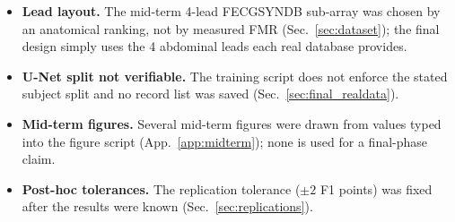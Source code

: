 \begin{finalpart}
\begin{itemize}
    \item \textbf{Lead layout.} The mid-term 4-lead FECGSYNDB sub-array was chosen by an anatomical ranking, not by measured FMR (Sec.~\ref{sec:dataset}); the final design simply uses the 4 abdominal leads each real database provides.
    \item \textbf{U-Net split not verifiable.} The training script does not enforce the stated subject split and no record list was saved (Sec.~\ref{sec:final_realdata}).
    \item \textbf{Mid-term figures.} Several mid-term figures were drawn from values typed into the figure script (App.~\ref{app:midterm}); none is used for a final-phase claim.
    \item \textbf{Post-hoc tolerances.} The replication tolerance ($\pm 2$ F1 points) was fixed after the results were known (Sec.~\ref{sec:replications}).
\end{itemize}
\end{finalpart}
